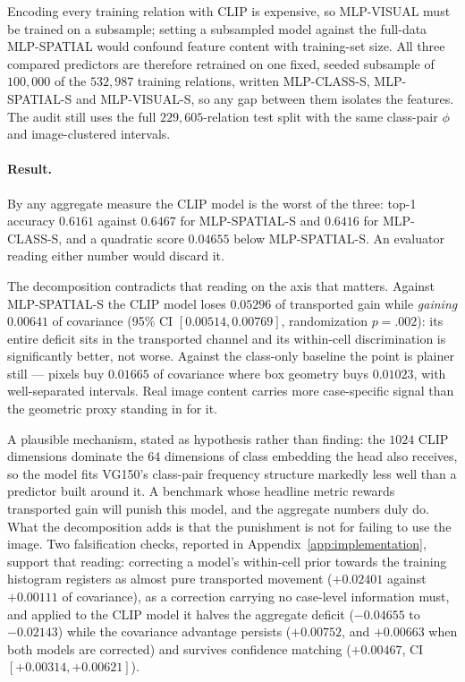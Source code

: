 Encoding every training relation with CLIP is expensive, so MLP-VISUAL must be trained on a
subsample; setting a subsampled model against the full-data MLP-SPATIAL would confound
feature content with training-set size. All three compared predictors are therefore
retrained on one fixed, seeded subsample of $100{,}000$ of the $532{,}987$ training
relations, written MLP-CLASS-S, MLP-SPATIAL-S and MLP-VISUAL-S, so any gap between them
isolates the features. The audit still uses the full $229{,}605$-relation test split with
the same class-pair $\phi$ and image-clustered intervals.

\paragraph{Result.} By any aggregate measure the CLIP model is the worst of the three: top-1
accuracy $0.6161$ against $0.6467$ for MLP-SPATIAL-S and $0.6416$ for MLP-CLASS-S, and a
quadratic score $0.04655$ below MLP-SPATIAL-S. An evaluator reading either number would
discard it.

The decomposition contradicts that reading on the axis that matters. Against MLP-SPATIAL-S
the CLIP model loses $0.05296$ of transported gain while \emph{gaining} $0.00641$ of
covariance (95\% CI $[0.00514,0.00769]$, randomization $p=.002$): its entire deficit sits in
the transported channel and its within-cell discrimination is significantly better, not
worse. Against the class-only baseline the point is plainer still --- pixels buy $0.01665$
of covariance where box geometry buys $0.01023$, with well-separated intervals. Real image
content carries more case-specific signal than the geometric proxy standing in for it.

A plausible mechanism, stated as hypothesis rather than finding: the $1024$ CLIP dimensions
dominate the $64$ dimensions of class embedding the head also receives, so the model fits
VG150's class-pair frequency structure markedly less well than a predictor built around it. A
benchmark whose headline metric rewards transported gain will punish this model, and the
aggregate numbers duly do. What the decomposition adds is that the punishment is not for
failing to use the image. Two falsification checks, reported in
Appendix~\ref{app:implementation}, support that reading: correcting a model's within-cell
prior towards the training histogram registers as almost pure transported movement
($+0.02401$ against $+0.00111$ of covariance), as a correction carrying no case-level
information must, and applied to the CLIP model it halves the aggregate deficit ($-0.04655$
to $-0.02143$) while the covariance advantage persists ($+0.00752$, and $+0.00663$ when both
models are corrected) and survives confidence matching ($+0.00467$, CI
$[+0.00314,+0.00621]$).

